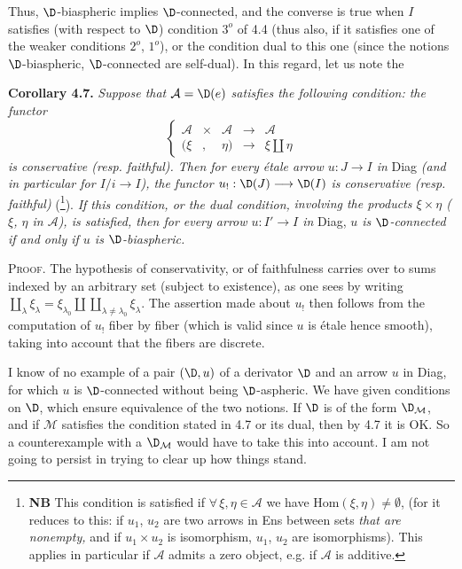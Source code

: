 Thus, $\D$-biaspheric implies $\D$-connected, and the converse is true when $I$ satisfies (with respect to $\D$) condition $3^o$ of 4.4 (thus also, if it satisfies one of the weaker conditions $2^o$, $1^o$), or the condition dual to this one (since the notions $\D$-biaspheric, $\D$-connected are self-dual). In this regard, let us note the

\textbf{Corollary 4.7.} \textit{Suppose that $\mathcal{A} = \D(e)$ satisfies the following condition: the functor}
\[
\left\{
\begin{array}{lcccl}
\mathcal{A} & \times & \mathcal{A} & \longrightarrow & \mathcal{A} \\[1ex]
(\xi & , & \eta) & \longrightarrow & \xi \amalg \eta
\end{array}
\right.
\]
\textit{is conservative (resp. faithful). Then for every étale arrow $u : J \longrightarrow I$ in} Diag \textit{(and in particular for $I/i \longrightarrow I$), the functor $u_! : \D(J) \longrightarrow \D(I)$ is conservative (resp. faithful)} (\footnote{\textbf{NB} This condition is satisfied if $\forall\, \xi, \eta \in \mathcal{A}$ we have $\mathrm{Hom}(\xi,\eta) \neq \emptyset$, (for it reduces to this: if $u_1$,
$u_2$ are two arrows in Ens between sets \textit{that are nonempty,} and if $u_1 \times u_2$ is isomorphism, $u_1$, $u_2$ are isomorphisms). This applies in particular if $\mathcal{A}$ admits a zero object, e.g. if $\mathcal{A}$ is additive.}). \textit{If this condition, or the dual condition,}
\textit{involving the products $\xi\times\eta$ ($\xi$, $\eta$ in $\mathcal{A}$), is satisfied, then for every arrow $u : I' \longrightarrow I$ in} Diag, \textit{$u$ is $\D$-connected if and only if $u$ is $\D$-biaspheric.}

\textsc{Proof.} The hypothesis of conservativity, or of faithfulness carries over to sums indexed by an arbitrary set (subject to existence), as one sees by writing $\coprod\limits_{\lambda} \xi_\lambda = \xi_{\lambda_0} \amalg \coprod\limits_{\lambda\neq\lambda_0} \xi_\lambda$. The assertion made about $u_!$ then follows from the computation of $u_!$ fiber by fiber (which is valid since $u$ is étale hence smooth), taking into account that the fibers are discrete.

I know of no example of a pair $(\D, u)$ of a derivator $\D$ and an arrow $u$ in Diag, for which $u$ is $\D$-connected without being $\D$-aspheric. We have given conditions on $\D$, which ensure equivalence of the two notions. If $\D$ is of the form $\D_{\mathcal{M}}$, and if $\mathcal{M}$ satisfies the condition stated in 4.7 or its dual, then by 4.7 it is OK. So a counterexample with a $\D_{\mathcal{M}}$ would have to take this into account. I am not going to persist in trying to clear up how things stand.

